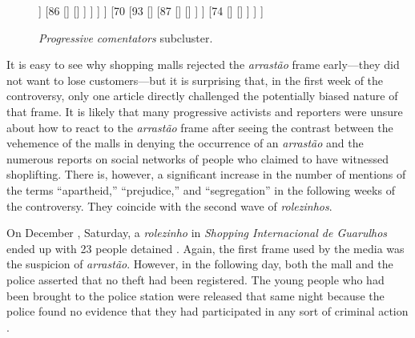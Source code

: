 \begin{figure}
\centering
\begin{forest}
[77, for tree={grow=east,anchor=west,child anchor=west}
	[91
		[{\autocite[][Maria Frô: Bricolage of arguments]{maria_fro}}]
		[90
			[{\autocite[][\emph{G1}: Participants explain the \emph{rolezinhos}]{g1_naspalavras}}]
			[93
				[88
					[{\autocite[][Capriglione: second \emph{rolezinho}]{folha_laura}}]
					[{\autocite[][Martín: Apartheid in the mall?]{elpais_apartheid}}]
				]
				[86
					[{\autocite[][Pinheiro-Machado: opinion from Oxford]{rosana}}]
					[{\autocite[][Minister: white dudes fear \emph{rolezinhos}]{folhapolitica_medo_brancos}}]
				]
			]
		]
	]
	[70
		[93
			[{\autocite[][Boff: We are an unfair society]{boff_rolezinhos}}]
			[87
				[{\autocite[][Brum: New barbarians]{brum_vandalos}}]
				[{\autocite[][Sakamoto: The virtual reality of malls]{sakamoto_rolezinho}}]
			]
		]
		[74
			[{\autocite[][Brum: An homophobic crime and the \emph{rolezinhos}]{brum_kaique}}]
			[{\autocite[][Left-wing party approaches promoters of \emph{rolezinhos}]{terra_rolezeiros_ujs}}]
		]
	]
]
\end{forest}
\caption{\emph{Progressive comentators} subcluster.}
\label{progressivecomentators_subcluster}
\end{figure}

It is easy to see why shopping malls rejected the \emph{arrastão} frame early---they did not want to lose customers---but it is surprising that, in the first week of the controversy, only one article directly challenged the potentially biased nature of that frame. It is likely that many progressive activists and reporters were unsure about how to react to the \emph{arrastão} frame after seeing the contrast between the vehemence of the malls in denying the occurrence of an \emph{arrastão} and the numerous reports on social networks of people who claimed to have witnessed shoplifting. There is, however, a significant increase in the number of mentions of the terms \enquote{apartheid,} \enquote{prejudice,} and \enquote{segregation} in the following weeks of the controversy. They coincide with the second wave of \emph{rolezinhos}.

On December , Saturday, a \emph{rolezinho} in \emph{Shopping Internacional de Guarulhos} \autocite{g1_guarulhos} ended up with 23 people detained \autocite{estado_guarulhos,folha_guarulhos}. Again, the first frame used by the media was the suspicion of \emph{arrastão}. However, in the following day, both the mall and the police asserted that no theft had been registered. The young people who had been brought to the police station were released that same night because the police found no evidence that they had participated in any sort of criminal action \autocite{folha_libertacao_guarulhos}.

